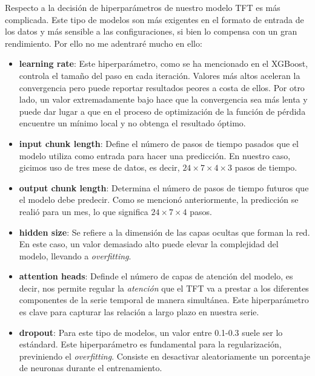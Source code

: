 %
%
%
Respecto a la decisión de hiperparámetros de nuestro modelo TFT es más complicada. Este tipo de modelos son más exigentes en el formato de entrada de los datos y más sensible a las configuraciones, si bien lo compensa con un gran rendimiento. Por ello no me adentraré mucho en ello:
\begin{itemize}
    \item \textbf{learning rate}: Este hiperparámetro, como se ha mencionado en el XGBoost, controla el tamaño del paso en cada iteración. Valores más altos aceleran la convergencia pero puede reportar resultados peores a costa de ellos. Por otro lado, un valor extremadamente bajo hace que la convergencia sea más lenta y puede dar lugar a que en el proceso de optimización de la función de pérdida encuentre un mínimo local y no obtenga el resultado óptimo.
    
    \item \textbf{input chunk length}: Define el número de pasos de tiempo pasados que el modelo utiliza como entrada para hacer una predicción. En nuestro caso, gicimos uso de tres mese de datos, es decir, $24 \times 7 \times 4 \times 3$ pasos de tiempo.
    \item \textbf{output chunk length}: Determina el número de pasos de tiempo futuros que el modelo debe predecir. Como se mencionó anteriormente, la predicción se realió para un mes, lo que significa $24 \times 7 \times 4$ pasos.
     
    \item \textbf{hidden size}: Se refiere a la dimensión de las capas ocultas que forman la red. En este caso, un valor demasiado alto puede elevar la complejidad del modelo, llevando a \textit{overfitting}.
     
    \item \textbf{attention heads}: Definde el número de capas de atención del modelo, es decir, nos permite regular la \textit{atención} que el TFT va a prestar a los diferentes componentes de la serie temporal de manera simultánea. Este hiperparámetro es clave para capturar las relación a largo plazo en nuestra serie.
     
    \item \textbf{dropout}: Para este tipo de modelos, un valor entre 0.1-0.3 suele ser lo estándard. Este hiperparámetro es fundamental para la regularización, previniendo el \textit{overfitting}. Consiste en desactivar aleatoriamente un porcentaje de neuronas durante el entrenamiento.
\end{itemize}

